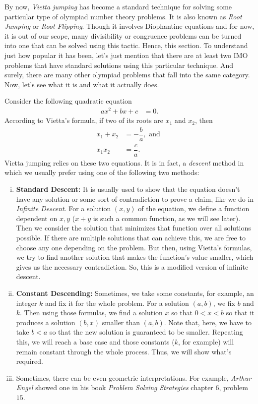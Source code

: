 \documentclass{subfile}
\begin{document}
	By now, \textit{Vietta jumping} has become a standard technique for solving some particular type of olympiad number theory problems. It is also known as \textit{Root Jumping} or \textit{Root Flipping}. Though it involves Diophantine equations and for now, it is out of our scope, many divisibility or congruence problems can be turned into one that can be solved using this tactic. Hence, this section.
	To understand just how popular it has been, let's just mention that there are at least two IMO problems that have standard solutions using this particular technique. And surely, there are many other olympiad problems that fall into the same category. Now, let's see what it is and what it actually does.

	Consider the following quadratic equation
		\begin{align*}
		 	ax^2+bx+c & = 0.
		\end{align*}
	According to Vietta's formula, if two of its roots are $x_1$ and $x_2$, then
		\begin{align*}
			x_1+x_2 & = -\dfrac{b}{a}, \text{ and }\\
			x_1x_2  & = \dfrac{c}{a}.
		\end{align*}
	Vietta jumping relies on these two equations. It is in fact, a \textit{descent} method in which we usually prefer using one of the following two methods:
		\begin{enumerate}[(i)]
			\item \textbf{Standard Descent:} It is usually used to show that the equation doesn't have any solution or some sort of contradiction to prove a claim, like we do in \textit{Infinite Descent}. For a solution $(x,y)$ of the equation, we define a function dependent on $x,y$ ($x+y$ is such a common function, as we will see later). Then we consider the solution that minimizes that function over all solutions possible. If there are multiple solutions that can achieve this, we are free to choose any one depending on the problem. But then, using Vietta's formulas, we try to find another solution that makes the function's value smaller, which gives us the necessary contradiction. So, this is a modified version of infinite descent.
			\item \textbf{Constant Descending:} Sometimes, we take some constants, for example, an integer $k$ and fix it for the whole problem. For a solution $(a,b)$, we fix $b$ and $k$. Then using those formulas, we find a solution $x$ so that $0<x<b$ so that it produces a solution $(b,x)$ smaller than $(a,b)$. Note that, here, we have to take $b<a$ so that the new solution is guaranteed to be smaller. Repeating this, we will reach a base case and those constants ($k$, for example) will remain constant through the whole process. Thus, we will show what's required.
			\item Sometimes, there can be even geometric interpretations. For example, \textit{Arthur Engel} showed one in his book \textit{Problem Solving Strategies} chapter $6$, problem $15$.
		\end{enumerate}
\end{document}
